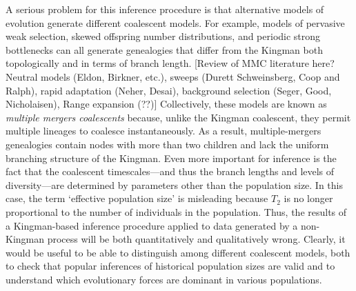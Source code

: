 \documentclass[11pt, letterpaper]{article}   	%
\begin{document}
A serious problem for this inference procedure is that alternative models of evolution generate different coalescent models.
For example, models of pervasive weak selection, skewed offspring number distributions, and periodic strong bottlenecks can all generate genealogies that differ from the Kingman both topologically and in terms of branch length.
[Review of MMC literature here? Neutral models (Eldon, Birkner, etc.), sweeps (Durett Schweinsberg, Coop and Ralph), rapid adaptation (Neher, Desai), background selection (Seger, Good, Nicholaisen), Range expansion (??)]
Collectively, these models are known as \emph{multiple mergers coalescents} because, unlike the Kingman coalescent, they permit multiple lineages to coalesce instantaneously.
As a result, multiple-mergers genealogies contain nodes with more than two children and lack the uniform branching structure of the Kingman.
Even more important for inference is the fact that the coalescent timescales---and thus the branch lengths and levels of diversity---are determined by parameters other than the population size.
In this case, the term `effective population size' is misleading because $T_2$ is no longer proportional to the number of individuals in the population.
Thus, the results of a Kingman-based inference procedure applied to data generated by a non-Kingman process will be both quantitatively and qualitatively wrong.
Clearly, it would be useful to be able to distinguish among different coalescent models, both to check that popular inferences of historical population sizes are valid and to understand which evolutionary forces are dominant in various populations.
\end{document}

